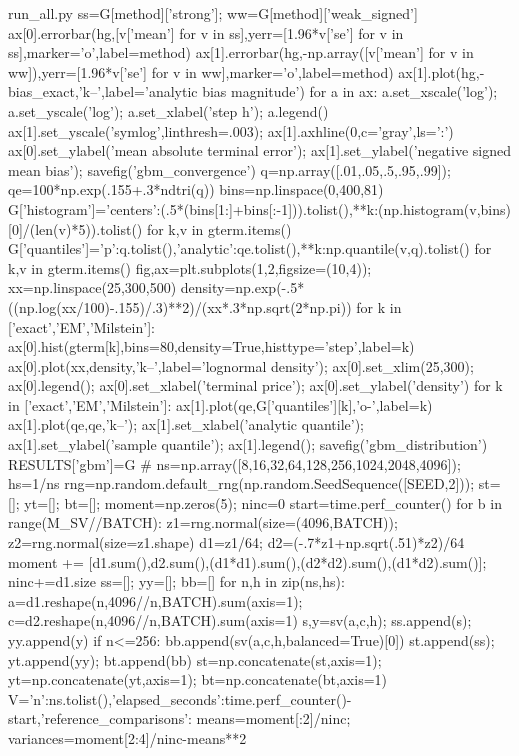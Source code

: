 \begin{filecontents*}[overwrite]{run_all.py}
    ss=G[method]['strong']; ww=G[method]['weak_signed']
    ax[0].errorbar(hg,[v['mean'] for v in ss],yerr=[1.96*v['se'] for v in ss],marker='o',label=method)
    ax[1].errorbar(hg,-np.array([v['mean'] for v in ww]),yerr=[1.96*v['se'] for v in ww],marker='o',label=method)
ax[1].plot(hg,-bias_exact,'k--',label='analytic bias magnitude')
for a in ax: a.set_xscale('log'); a.set_yscale('log'); a.set_xlabel('step h'); a.legend()
ax[1].set_yscale('symlog',linthresh=.003); ax[1].axhline(0,c='gray',ls=':')
ax[0].set_ylabel('mean absolute terminal error'); ax[1].set_ylabel('negative signed mean bias'); savefig('gbm_convergence')
q=np.array([.01,.05,.5,.95,.99]); qe=100*np.exp(.155+.3*ndtri(q))
bins=np.linspace(0,400,81)
G['histogram']={'centers':(.5*(bins[1:]+bins[:-1])).tolist(),**{k:(np.histogram(v,bins)[0]/(len(v)*5)).tolist() for k,v in gterm.items()}}
G['quantiles']={'p':q.tolist(),'analytic':qe.tolist(),**{k:np.quantile(v,q).tolist() for k,v in gterm.items()}}
fig,ax=plt.subplots(1,2,figsize=(10,4)); xx=np.linspace(25,300,500)
density=np.exp(-.5*((np.log(xx/100)-.155)/.3)**2)/(xx*.3*np.sqrt(2*np.pi))
for k in ['exact','EM','Milstein']: ax[0].hist(gterm[k],bins=80,density=True,histtype='step',label=k)
ax[0].plot(xx,density,'k--',label='lognormal density'); ax[0].set_xlim(25,300); ax[0].legend(); ax[0].set_xlabel('terminal price'); ax[0].set_ylabel('density')
for k in ['exact','EM','Milstein']: ax[1].plot(qe,G['quantiles'][k],'o-',label=k)
ax[1].plot(qe,qe,'k--'); ax[1].set_xlabel('analytic quantile'); ax[1].set_ylabel('sample quantile'); ax[1].legend(); savefig('gbm_distribution')
RESULTS['gbm']=G
# %
ns=np.array([8,16,32,64,128,256,1024,2048,4096]); hs=1/ns
rng=np.random.default_rng(np.random.SeedSequence([SEED,2])); st=[]; yt=[]; bt=[]; moment=np.zeros(5); ninc=0
start=time.perf_counter()
for b in range(M_SV//BATCH):
    z1=rng.normal(size=(4096,BATCH)); z2=rng.normal(size=z1.shape)
    d1=z1/64; d2=(-.7*z1+np.sqrt(.51)*z2)/64
    moment += [d1.sum(),d2.sum(),(d1*d1).sum(),(d2*d2).sum(),(d1*d2).sum()]; ninc+=d1.size
    ss=[]; yy=[]; bb=[]
    for n,h in zip(ns,hs):
        a=d1.reshape(n,4096//n,BATCH).sum(axis=1); c=d2.reshape(n,4096//n,BATCH).sum(axis=1)
        s,y=sv(a,c,h); ss.append(s); yy.append(y)
        if n<=256: bb.append(sv(a,c,h,balanced=True)[0])
    st.append(ss); yt.append(yy); bt.append(bb)
st=np.concatenate(st,axis=1); yt=np.concatenate(yt,axis=1); bt=np.concatenate(bt,axis=1)
V={'n':ns.tolist(),'elapsed_seconds':time.perf_counter()-start,'reference_comparisons':{}}
means=moment[:2]/ninc; variances=moment[2:4]/ninc-means**2

\end{filecontents*}

